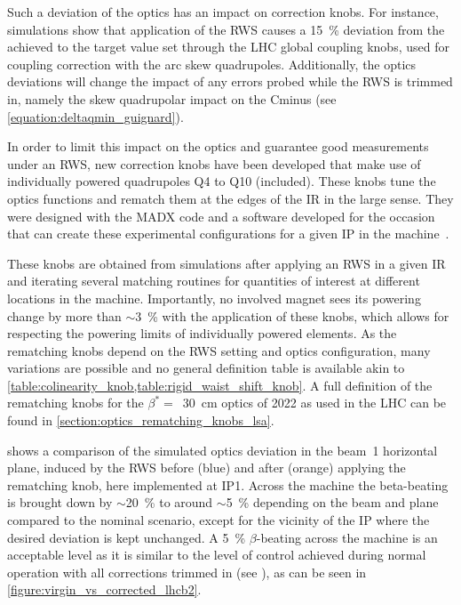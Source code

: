 Such a deviation of the optics has an impact on correction knobs.
For instance, simulations show that application of the RWS causes a \qty{15}{\percent} deviation from the achieved  to the target value set through the LHC global coupling knobs, used for coupling correction with the arc skew quadrupoles.
Additionally, the optics deviations will change the impact of any errors probed while the RWS is trimmed in, namely the skew quadrupolar impact on the \gls{Cminus} (see \cref{equation:deltaqmin_guignard}).

In order to limit this impact on the optics and guarantee good measurements under an RWS, new correction knobs have been developed that make use of individually powered quadrupoles Q\num{4} to Q\num{10} (included). 
These knobs tune the optics functions and rematch them at the edges of the IR in the large sense.
They were designed with the \gls{MADX} code and a software developed for the occasion that can create these experimental configurations for a given IP in the machine~\cite{CODE:Soubelet:pyrws}.

These knobs are obtained from simulations after applying an RWS in a given IR and iterating several matching routines for quantities of interest at different locations in the machine.
Importantly, no involved magnet sees its powering change by more than \(\sim\)\qty{3}{\percent} with the application of these knobs, which allows for respecting the powering limits of individually powered elements.
As the rematching knobs depend on the RWS setting and optics configuration, many variations are possible and no general definition table is available akin to \cref{table:colinearity_knob,table:rigid_waist_shift_knob}.
A full definition of the rematching knobs for the \(\beta^{\ast} =\)~\qty{30}{\centi\meter} optics of 2022 as used in the LHC can be found in \cref{section:optics_rematching_knobs_lsa}.

 shows a comparison of the simulated optics deviation in the beam~\num{1} horizontal plane, induced by the RWS before (\textcolor{mplblue}{blue}) and after (\textcolor{mplorange}{orange}) applying the rematching knob, here implemented at IP\num{1}.
Across the machine the \gls{beta-beating} is brought down by \(\sim\)\qty{20}{\percent} to around \(\sim\)\qty{5}{\percent} depending on the beam and plane compared to the nominal scenario, except for the vicinity of the IP where the desired deviation is kept unchanged.
A \qty{5}{\percent} \(\beta\)-beating across the machine is an acceptable level as it is similar to the level of control achieved during normal operation with all corrections trimmed in (see \cite{PRAB:Persson:LHC_Optics_Commissioning_OnePercent,CERN:Persson:LHCOpticsCorrectionsEvian2019}), as can be seen in \cref{figure:virgin_vs_corrected_lhcb2}.

